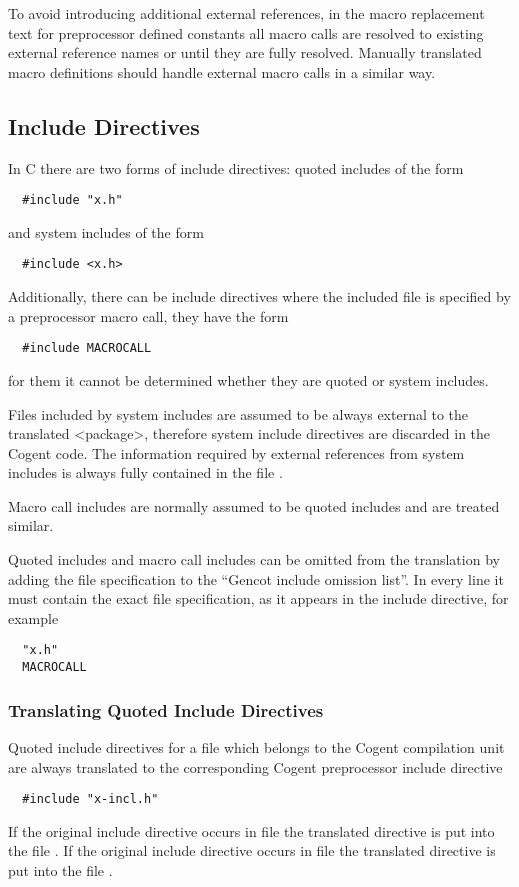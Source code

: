 To avoid introducing additional external references, in the macro replacement text for preprocessor defined 
constants all macro calls are resolved to existing external reference names or until they are fully resolved.
Manually translated macro definitions should handle external macro calls in a similar way.

\subsection{Include Directives}
\label{design-preprocessor-incl}

In C there are two forms of include directives: quoted includes of the form
\begin{verbatim}
  #include "x.h"
\end{verbatim}
and system includes of the form
\begin{verbatim}
  #include <x.h>
\end{verbatim}
Additionally, there can be include directives where the included file is specified by a preprocessor macro call,
they have the form
\begin{verbatim}
  #include MACROCALL
\end{verbatim}
for them it cannot be determined whether they are quoted or system includes.

Files included by system includes are assumed to be always external to the translated <package>, therefore system
include directives are discarded in the Cogent code. The information required by external references from system 
includes is always fully contained in the file .

Macro call includes are normally assumed to be quoted includes and are treated similar.

Quoted includes and macro call includes can be omitted from the translation by adding the file specification
to the ``Gencot include omission list''. In every line it must contain the exact file specification, as it
appears in the include directive, for example
\begin{verbatim}
  "x.h"
  MACROCALL
\end{verbatim}

\subsubsection{Translating Quoted Include Directives}

Quoted include directives for a file  which belongs to the Cogent compilation unit are always translated 
to the corresponding Cogent preprocessor include directive
\begin{verbatim}
  #include "x-incl.h"
\end{verbatim}
If the original include directive occurs in file  the translated directive is put into the file 
. If the original include directive occurs in file  the translated directive is put into the file
. 


